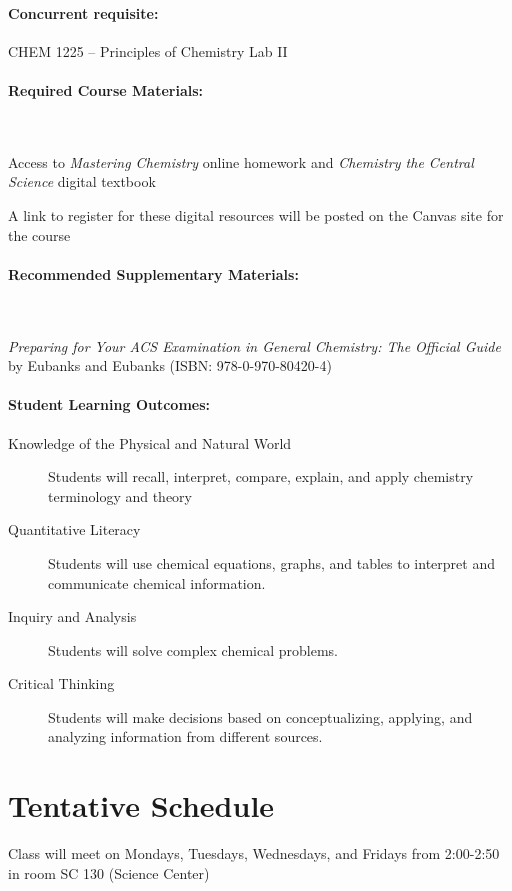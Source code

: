 \documentclass[12pt, letterpaper]{article}
\begin{document}
\paragraph{Concurrent requisite:}
CHEM 1225 -- Principles of Chemistry Lab II

\paragraph{Required Course Materials:} ~

Access to \emph{Mastering Chemistry} online homework and \emph{Chemistry the Central Science} digital textbook

\noindent A link to register for these digital resources will be posted on the Canvas site for the course

\paragraph{Recommended Supplementary Materials:} ~

\emph{Preparing for Your ACS Examination in General Chemistry: The Official Guide} by Eubanks and Eubanks (ISBN: 978-0-970-80420-4)

\paragraph{Student Learning Outcomes:}
\begin{description}
	\item[Knowledge of the Physical and Natural World] Students will recall, interpret, compare, explain, and apply chemistry terminology and theory
	\item[Quantitative Literacy] Students will use chemical equations, graphs, and tables to interpret and communicate chemical information.
	\item[Inquiry and Analysis] Students will solve complex chemical problems.
	\item[Critical Thinking] Students will make decisions based on conceptualizing, applying, and analyzing information from different sources.
\end{description}

\section*{Tentative Schedule}
Class will meet on Mondays, Tuesdays, Wednesdays, and Fridays from 2:00-2:50 in room SC 130 (Science Center)
\end{document}
